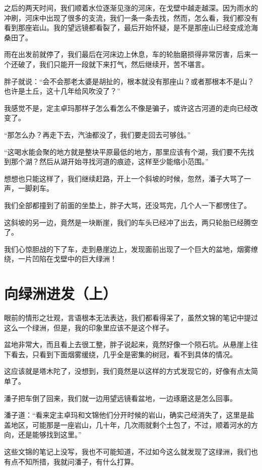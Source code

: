 之后的两天时间，我们顺着水位逐渐见涨的河床，在戈壁中越走越深。因为雨水的冲刷，河床中出现了很多的支流，我们一条一条去找，然而，怎么看，我们都没有看到那座岩山。我的望远镜都看裂了，最后开始怀疑，是不是那座山已经变成沧海桑田了。

雨在出发前就停了，我们最后在河床边上休息，车的轮胎磨损得非常厉害，后来一个还破了，我们只能开一段就下来打气，然后继续开，苦不堪言。

胖子就说：“会不会那老太婆是胡扯的，根本就没有那座山？或者那根本不是山？也许是土丘，这十几年给风吹没了？”

我感觉不是，定主卓玛那样子怎么看怎么不像是骗子，或许这古河道的走向已经改变了。

“那怎么办？再走下去，汽油都没了，我们要走回去可够戗。”

“这喝水能会聚的地方就是整块平原最低的地方，那里应该有个湖，我们要不先找到那个湖？然后从湖开始寻找河道的痕迹，这样至少能缩小范围。”

想想也只能这样了，我们继续赶路，开上一个斜坡的时候，忽然，潘子大骂了一声，一脚刹车。

我们全部都撞到了前面的坐垫上，胖子大骂，还没骂完，几个人一下都愣住了。

这斜坡的另一边，竟然是一块断崖，我们的车头已经冲了出去，两只轮胎已经腾空了。

我们心惊胆战的下了车，走到悬崖边上，发现面前出现了一个巨大的盆地，烟雾缭绕，一片凹陷在戈壁中的巨大绿洲！

\chapter{向绿洲进发（上）}

眼前的情形之壮观，言语根本无法表达，我们都看得呆了，虽然文锦的笔记中提过这么一个绿洲，但是，我的印象里应该不是这个样子。

盆地非常大，而且看上去很工整，胖子说起来，竟然好像一个陨石坑。从悬崖上往下看去，只看到下面烟雾缓绕，几乎全是密集的树冠，看不到具体的情况。

这应该就是塔木陀了，没想到，我们竟然是以这样的方式发现它的，好像有点太简单了。

潘子把车倒了回来，我们就一边用望远镜看盆地，一边琢磨这是怎么回事。

潘子道：“看来定主卓玛和文锦他们分开时候的岩山，确实己经消失了，这里是盐盖地区，可能那是一座岩山，几十年，几次雨就剩个土包了，不过，顺着河水的方向，还是能够找到这里。”

这些文锦的笔记上没写，我也不可能知道，不过如今这么就发现了这绿洲，我们也有点不知所措，我就问潘子，有什么打算。

